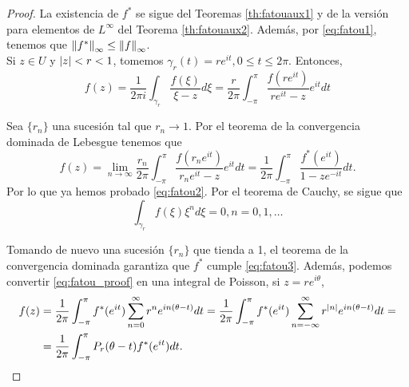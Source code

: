 \begin{proof}
    La existencia de $f^*$ se sigue del Teoremas \ref{th:fatouaux1} y de la versión para elementos de $L^\infty$ del Teorema \ref{th:fatouaux2}. Además, por \eqref{eq:fatou1}, tenemos que $\left\lVert f^*\right\rVert_{\infty} \leq \left\lVert f\right\rVert_{\infty}$. \\

    Si $z \in U$ y $\left\lvert z\right\rvert < r < 1$, tomemos $\gamma_r(t) = r e^{it}, 0 \leq t \leq 2\pi$. Entonces,
    \begin{equation*}
        f(z) = \dfrac{1}{2 \pi i} \int_{\gamma_r} \dfrac{f(\xi)}{\xi - z} d\xi =
        \dfrac{r}{2 \pi} \int_{-\pi}^{\pi} \dfrac{f(re^{it})}{re^{it} - z}e^{it} dt
    \end{equation*}

    Sea $\{r_n\}$ una sucesión tal que $r_n \to 1$. Por el teorema de la convergencia dominada de Lebesgue tenemos que %
    \begin{equation}
        \label{eq:fatou_proof}
        f(z) = \lim_{n \to \infty} \frac{r_n}{2 \pi} \int_{-\pi}^{\pi} \frac{f(r_n e^{it})}{r_n e^{it} - z} e^{it} dt =  \dfrac{1}{2 \pi} \int_{-\pi}^{\pi} \dfrac{f^* (e^{it})}{1 - ze^{-it}} dt.
    \end{equation}
    Por lo que ya hemos probado \eqref{eq:fatou2}. Por el teorema de Cauchy, se sigue que
    \begin{equation*}
        \int_{\gamma_r} f(\xi)\xi^n d\xi = 0, n = 0, 1, \dots
    \end{equation*}

    Tomando de nuevo una sucesión $\{r_n\}$ que tienda a 1, el teorema de la convergencia dominada garantiza que $f^*$ cumple \eqref{eq:fatou3}. Además, podemos convertir \eqref{eq:fatou_proof} en una integral de Poisson, si $z = re^{i \theta}$,
    \begin{equation}
        \label{eq:fatou_poisson}
         \begin{split}
             f(z) & = \dfrac{1}{2 \pi} \int_{- \pi}^{\pi} f^*(e^{it}) \sum_{n=0}^{\infty} r^n e^{in(\theta - t)} dt =  \dfrac{1}{2 \pi} \int_{- \pi}^{\pi} f^*(e^{it}) \sum_{n=-\infty}^{\infty} r^{\left\lvert n\right\rvert} e^{in(\theta - t)} dt = \\
                  & =  \dfrac{1}{2 \pi} \int_{- \pi}^{\pi} P_r(\theta - t) f^*(e^{it}) dt.
         \end{split}
    \end{equation}


\end{proof}
